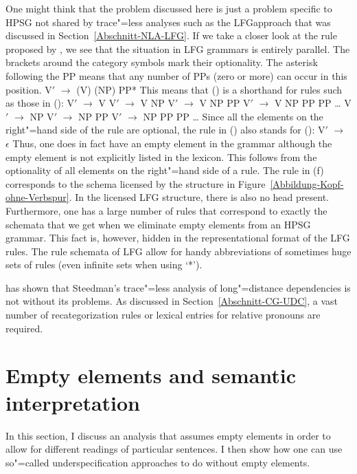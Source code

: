 One might think that the problem discussed here is just a problem specific to HPSG not shared by trace"=less analyses such as the LFG\indexlfgstart approach
that was discussed in Section~\ref{Abschnitt-NLA-LFG}. If we take a closer look at the rule proposed
by \citet[]{Dalrymple2006a}, we see that the situation in LFG grammars is entirely
parallel. The brackets around the category symbols mark their optionality. The asterisk following
the PP means that any number of PPs (zero or more) can occur in this position.
\ea
V$'$ $\to$ (V) (NP) PP*
\z
This means that () is a shorthand for rules such as those in ():
\eal
\ex V$'$ $\to$ V
\ex V$'$ $\to$ V NP
\ex V$'$ $\to$ V NP PP
\ex V$'$ $\to$ V NP PP PP
\ex \ldots
\ex V$'$ $\to$ NP
\ex V$'$ $\to$ NP PP
\ex V$'$ $\to$ NP PP PP
\ex \ldots
\zl
Since all the elements on the right"=hand side of the rule are optional, the rule in () also stands for ():
\ea
V$'$ $\to$ $\epsilon$
\z
\addlines
Thus, one does in fact have an empty element in the grammar although the empty element is not explicitly listed in the lexicon.
This follows from the optionality of all elements on the right"=hand side of a rule. The rule in (f) corresponds
to the schema licensed by the structure in Figure~\ref{Abbildung-Kopf-ohne-Verbspur}. In the licensed LFG structure, there is 
also no head present. Furthermore, one has a large number of rules that correspond to exactly the schemata that we get when
we eliminate empty elements from an HPSG grammar. This fact is, however, hidden in the representational format of the LFG rules.
The rule schemata of LFG allow for handy abbreviations of sometimes huge sets of rules (even infinite sets when using `*').\indexlfgend

\citet{Pollard88a} has shown that Steedman's trace"=less analysis of long"=distance dependencies is not without its problems.
As discussed in Section~\ref{Abschnitt-CG-UDC}, a vast number of recategorization rules or lexical entries for
relative pronouns are required.

\section{Empty elements and semantic interpretation}
\label{Abschnitt-leere-Elemente-Semantik}
\label{sec-MRS-wieder}

In this section, I discuss an analysis that assumes empty elements in order to allow for different readings of particular sentences. I then show how
one can use so"=called underspecification approaches to do without empty elements.

